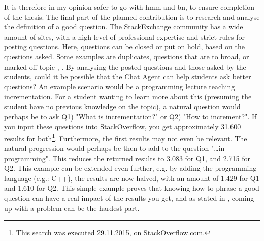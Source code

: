 It is therefore in my opinion safer to go with \gls{hmm} and \gls{bn}, to ensure completion of the thesis.
\vspace{0.5em}\newline
The final part of the planned contribution is to research and analyse the definition of a good question. The StackExchange community has a wide amount of sites, with a high level 
of professional expertise and strict rules for posting questions. Here, questions can be closed or put on hold, based on the questions asked. Some examples are duplicates, questions 
that are to broad, or marked off-topic \cite{Stackoverflow.com2015}, \cite{CommunityWiki2015}. By analysing the posted questions and those asked by the students, could it be possible 
that the Chat Agent can help students ask better questions? An example scenario would be a programming lecture teaching incrementation. For a student wanting to learn more about this 
(presuming the student have no previous knowledge on the topic), a natural question would perhaps be to ask Q1) "What is incrementation?" or Q2) "How to increment?". If you input 
these questions into StackOverflow, you get approximately 31.600 results for both\footnote{This search was executed 29.11.2015, on StackOverflow.com.}. Furthermore, the first results 
may not even be relevant. The natural progression would perhaps be then to add to the question "\ldots in programming". This reduces the returned results to 3.083 for Q1, and 2.715 
for Q2. This example can be extended even further, e.g. by adding the programming language (e.g.: C++), the results are now halved, with an amount of 1.429 for Q1 and 1.610 for Q2. 
This simple example proves that knowing how to phrase a good question can have a real impact of the results you get, and as stated in \cite{Lucky2011}, coming up with a problem can be 
the hardest part.